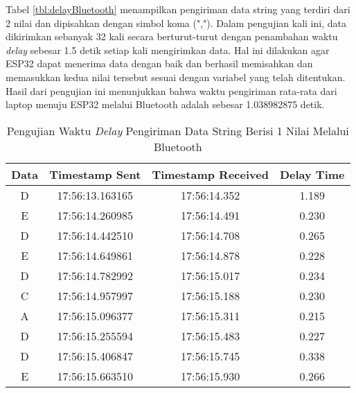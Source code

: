 Tabel \ref{tbl:delayBluetooth} menampilkan pengiriman data string yang terdiri dari 2 nilai dan dipisahkan dengan simbol koma (","). Dalam pengujian kali ini, data dikirimkan sebanyak 32 kali secara berturut-turut dengan penambahan waktu \emph{delay} sebesar 1.5 detik setiap kali mengirimkan data. Hal ini dilakukan agar ESP32 dapat menerima data dengan baik dan berhasil memisahkan dan memasukkan kedua nilai tersebut sesuai dengan variabel yang telah ditentukan. Hasil dari pengujian ini menunjukkan bahwa waktu pengiriman rata-rata dari laptop menuju ESP32 melalui Bluetooth adalah sebesar 1.038982875 detik.

\begin{longtable}{|ccc|c|}
  \caption{Pengujian Waktu \emph{Delay} Pengiriman Data String Berisi 1 Nilai Melalui Bluetooth}
  \label{tbl:delayBluetooth1}\\
  \hline
  \multicolumn{1}{|c|}{Data} & \multicolumn{1}{c|}{Timestamp Sent}  & Timestamp Received & Delay Time   \\ \hline
  \endfirsthead
  \endhead
  \multicolumn{1}{|c|}{D}    & \multicolumn{1}{c|}{17:56:13.163165} & 17:56:14.352       & 1.189        \\ \hline
  \multicolumn{1}{|c|}{E}    & \multicolumn{1}{c|}{17:56:14.260985} & 17:56:14.491       & 0.230        \\ \hline
  \multicolumn{1}{|c|}{D}    & \multicolumn{1}{c|}{17:56:14.442510} & 17:56:14.708       & 0.265        \\ \hline
  \multicolumn{1}{|c|}{E}    & \multicolumn{1}{c|}{17:56:14.649861} & 17:56:14.878       & 0.228        \\ \hline
  \multicolumn{1}{|c|}{D}    & \multicolumn{1}{c|}{17:56:14.782992} & 17:56:15.017       & 0.234        \\ \hline
  \multicolumn{1}{|c|}{C}    & \multicolumn{1}{c|}{17:56:14.957997} & 17:56:15.188       & 0.230        \\ \hline
  \multicolumn{1}{|c|}{A}    & \multicolumn{1}{c|}{17:56:15.096377} & 17:56:15.311       & 0.215        \\ \hline
  \multicolumn{1}{|c|}{D}    & \multicolumn{1}{c|}{17:56:15.255594} & 17:56:15.483       & 0.227        \\ \hline
  \multicolumn{1}{|c|}{D}    & \multicolumn{1}{c|}{17:56:15.406847} & 17:56:15.745       & 0.338        \\ \hline
  \multicolumn{1}{|c|}{E}    & \multicolumn{1}{c|}{17:56:15.663510} & 17:56:15.930       & 0.266        \\ \hline

\end{longtable}
